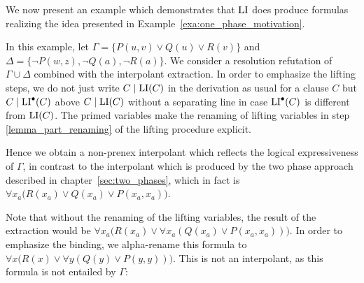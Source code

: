 We now present an example which demonstrates that $\operatorname{LI}$ does produce formulas realizing the idea presented in Example~\ref{exa:one_phase_motivation}.

\begin{exa}
	\label{exa:lemma_part_renaming}
	In this example,
	let $\Gamma = \{ P(u, v) \lor Q(u) \lor R(v) \}$
	and $\Delta = \{ \lnot P(w, z), \lnot Q(a), \lnot R(a)\}$.
	We consider a resolution refutation of $\Gamma\cup\Delta$ combined with the interpolant extraction.
	In order to emphasize the lifting steps,
	we do not just write $C\mid \operatorname{LI}(C)$ in the derivation as usual for a clause $C$ but $C\mid\operatorname{LI}^\bullet(C)$ above $C\mid \operatorname{LI}(C)$ without a separating line 
	in case $\operatorname{LI}^\bullet(C)$ is different from $\operatorname{LI}(C)$.
	The primed variables make the renaming of lifting variables in step \ref{lemma_part_renaming} of the lifting procedure explicit.
	\begin{adjustwidth}{-0.8em}{}
		\begin{prooftree}



			\noLine


			\insertBetweenHyps{\hskip -1cm}
			\noLine
		\end{prooftree}
		\medskip
	\end{adjustwidth}

	Hence we obtain a non-prenex interpolant which reflects the logical expressiveness of $\Gamma$, in contrast to 
	the interpolant which is produced by the two phase approach described in chapter~\ref{sec:two_phases}, which in fact is
	$\forall x_a \big( R(x_a) \lor Q(x_a) \lor P(x_a, x_a) \big)$.

	Note that without the renaming of the lifting variables, the result of the extraction would be
	$\forall x_a \big( R(x_a) \lor  \forall x_a( Q(x_a) \lor P(x_a, x_a) ) \big) $.
	In order to emphasize the binding, we alpha-rename this formula to
	$\forall x \big( R(x) \lor  \forall y( Q(y) \lor P(y, y) ) \big) $.
	This is not an interpolant, as this formula is not entailed by $\Gamma$:


\end{exa}

